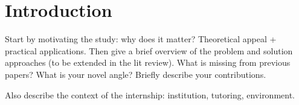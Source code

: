 \section{Introduction}

Start by motivating the study: why does it matter? Theoretical appeal + practical applications.
Then give a brief overview of the problem and solution approaches (to be extended in the lit review).
What is missing from previous papers? What is your novel angle?
Briefly describe your contributions.

Also describe the context of the internship: institution, tutoring, environment.